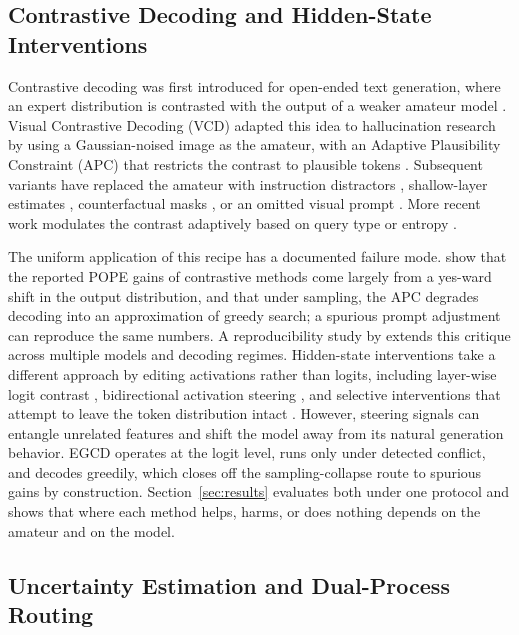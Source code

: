 \documentclass[pdflatex,sn-basic,Numbered]{sn-jnl}
\theoremstyle{thmstyleone}
\theoremstyle{thmstyletwo}
\theoremstyle{thmstylethree}
\begin{document}
\subsection{Contrastive Decoding and Hidden-State Interventions}\label{subsec:contrastive}

Contrastive decoding was first introduced for open-ended text generation, where an expert distribution is contrasted with the output of a weaker amateur model \cite{li2023acontrastive,su2022empirical}. Visual Contrastive Decoding (VCD) adapted this idea to hallucination research by using a Gaussian-noised image as the amateur, with an Adaptive Plausibility Constraint (APC) that restricts the contrast to plausible tokens \cite{leng2024mitigating}. Subsequent variants have replaced the amateur with instruction distractors \cite{wang2024mitigating}, shallow-layer estimates \cite{huo2025self}, counterfactual masks \cite{xiao2026macd}, or an omitted visual prompt \cite{favero2024multi}. More recent work modulates the contrast adaptively based on query type or entropy \cite{im2025selfaug,huang2026chasd}.

The uniform application of this recipe has a documented failure mode. \cite{yin2025mirage} show that the reported POPE gains of contrastive methods come largely from a yes-ward shift in the output distribution, and that under sampling, the APC degrades decoding into an approximation of greedy search; a spurious prompt adjustment can reproduce the same numbers. A reproducibility study by \cite{bendre2026rethinking} extends this critique across multiple models and decoding regimes. Hidden-state interventions take a different approach by editing activations rather than logits, including layer-wise logit contrast \cite{chuang2024dola}, bidirectional activation steering \cite{su2025activation}, and selective interventions that attempt to leave the token distribution intact \cite{wang2025contextfocus,zhang2026mitigating}. However, steering signals can entangle unrelated features and shift the model away from its natural generation behavior. EGCD operates at the logit level, runs only under detected conflict, and decodes greedily, which closes off the sampling-collapse route to spurious gains by construction. Section~\ref{sec:results} evaluates both under one protocol and shows that where each method helps, harms, or does nothing depends on the amateur and on the model.

\subsection{Uncertainty Estimation and Dual-Process Routing}\label{subsec:uncertainty}
\end{document}
